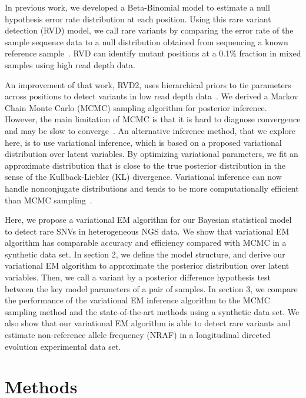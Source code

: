 \documentclass{bmcart}
\begin{document}

In previous work, we developed a Beta-Binomial model to estimate a null hypothesis error rate distribution at each position.
Using this rare variant detection (RVD) model, we call rare variants by comparing the error rate of the sample sequence data to a null distribution obtained from sequencing a known reference sample~\cite{flaherty2011ultrasensitive}.
RVD can identify mutant positions at a 0.1\% fraction in mixed samples using high read depth data.

An improvement of that work, RVD2, uses hierarchical priors to tie parameters across positions to detect variants in low read depth data~\cite{he2015rvd2}.
We derived a Markov Chain Monte Carlo (MCMC) sampling algorithm for posterior inference.
However, the main limitation of MCMC is that it is hard to diagnose convergence and may be slow to converge~\cite{jordan1999introduction}.
An alternative inference method, that we explore here, is to use variational inference, which is based on a proposed variational distribution over latent variables.
By optimizing variational parameters, we fit an approximate distribution that is close to the true posterior distribution in the sense of the Kullback-Liebler (KL) divergence.
Variational inference can now handle nonconjugate distributions and tends to be more computationally efficient than MCMC sampling~\cite{peterson1989explorations}.

Here, we propose a variational EM algorithm for our Bayesian statistical model to detect rare SNVs in heterogeneous NGS data.
We show that variational EM algorithm has comparable accuracy and efficiency compared with MCMC in a synthetic data set.
In section 2, we define the model structure, and derive our variational EM algorithm to approximate the posterior distribution over latent variables.
Then, we call a variant by a posterior difference hypothesis test between the key model parameters of a pair of samples.
In section 3, we compare the performance of the variational EM inference algorithm to the MCMC sampling method and the state-of-the-art methods using a synthetic data set.
We also show that our variational EM algorithm is able to detect rare variants and estimate non-reference allele frequency (NRAF) in a longitudinal directed evolution experimental data set.

\section{Methods}
\end{document}

